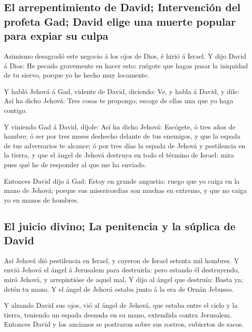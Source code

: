 \hypertarget{el-arrepentimiento-de-david-intervenciuxf3n-del-profeta-gad-david-elige-una-muerte-popular-para-expiar-su-culpa}{%
\subsection{El arrepentimiento de David; Intervención del profeta Gad;
David elige una muerte popular para expiar su
culpa}\label{el-arrepentimiento-de-david-intervenciuxf3n-del-profeta-gad-david-elige-una-muerte-popular-para-expiar-su-culpa}}

 Asimismo desagradó este negocio á los ojos de Dios, é
hirió á Israel.  Y dijo David á Dios: He pecado gravemente
en hacer esto: ruégote que hagas pasar la iniquidad de tu siervo, porque
yo he hecho muy locamente.

 Y habló Jehová á Gad, vidente de David, diciendo:
 Ve, y habla á David, y dile: Así ha dicho Jehová: Tres
cosas te propongo; escoge de ellas una que yo haga contigo.

 Y viniendo Gad á David, díjole: Así ha dicho Jehová:
 Escógete, ó tres años de hambre; ó ser por tres meses
deshecho delante de tus enemigos, y que la espada de tus adversarios te
alcance; ó por tres días la espada de Jehová y pestilencia en la tierra,
y que el ángel de Jehová destruya en todo el término de Israel: mira
pues qué he de responder al que me ha enviado.

 Entonces David dijo á Gad: Estoy en grande angustia:
ruego que yo caiga en la mano de Jehová; porque sus misericordias son
muchas en extremo, y que no caiga yo en manos de hombres.

\hypertarget{el-juicio-divino-la-penitencia-y-la-suxfaplica-de-david}{%
\subsection{El juicio divino; La penitencia y la súplica de
David}\label{el-juicio-divino-la-penitencia-y-la-suxfaplica-de-david}}

 Así Jehová dió pestilencia en Israel, y cayeron de
Israel setenta mil hombres.  Y envió Jehová el ángel á
Jerusalem para destruirla: pero estando él destruyendo, miró Jehová, y
arrepintióse de aquel mal,  Y dijo al ángel que destruía:
Basta ya; detén tu mano. Y el ángel de Jehová estaba junto á la era de
Ornán Jebuseo.

 Y alzando David sus ojos, vió al ángel de Jehová, que
estaba entre el cielo y la tierra, teniendo un espada desnuda en su
mano, extendida contra Jerusalem. Entonces David y los ancianos se
postraron sobre sus rostros, cubiertos de sacos.

